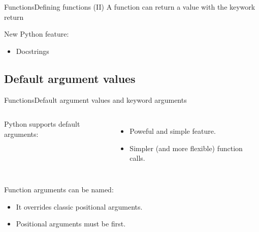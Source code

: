 \documentclass[10pt,compress]{beamer} %
\begin{document}

\begin{frame}{Functions}{Defining functions (II)}
    A function can return a value with the keywork \alert{return}
	\begin{exampleblock}{}
	\vspace{-0.2cm}
	
	\vspace{-0.2cm}
	\end{exampleblock}
    New Python feature:
    \begin{itemize}
        \item Docstrings
    \end{itemize}
\end{frame}

\subsection{Default argument values}
\begin{frame}{Functions}{Default argument values and keyword arguments}
    \begin{columns}
	Python supports default arguments:
		\begin{itemize}
		\item Poweful and simple feature.
		\item Simpler (and more flexible) function calls.
		\end{itemize}
		\vspace{-0.2cm}
		\begin{exampleblock}{}
		\vspace{-0.2cm}
		
		\vspace{-0.2cm}
		\end{exampleblock}
	\end{columns}
	Function arguments can be named:
		\begin{itemize}
		\item It overrides classic positional arguments.
		\item Positional arguments must be first.
		\end{itemize}
		\vspace{-0.2cm}
    \begin{columns}
		\begin{exampleblock}{}
		\vspace{-0.2cm}
		
		\vspace{-0.2cm}
		\end{exampleblock}

	\column{0.6\textwidth}
		\begin{exampleblock}{}
		\vspace{-0.2cm}
		
		\vspace{-0.2cm}
		\end{exampleblock}
	\end{columns}
\end{frame}
\end{document}
